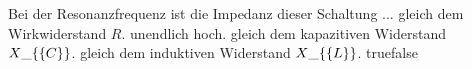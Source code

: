     {Bei der Resonanzfrequenz ist die Impedanz dieser Schaltung ...}
    {gleich dem Wirkwiderstand $R$.}
    {unendlich hoch.}
    {gleich dem kapazitiven Widerstand $X\_\{\textrm\{C\}\}$.}
    {gleich dem induktiven Widerstand $X\_\{\textrm\{L\}\}$.}
    {true}{false}